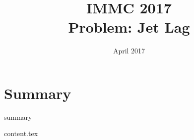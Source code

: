 \documentclass{article}
\title{IMMC 2017 \\
	\large Problem: Jet Lag}
\date{April 2017}
\begin{document}
\setlength{\abovedisplayskip}{0pt}
\setlength{\abovedisplayskip}{0pt}
\setlength{\belowdisplayskip}{0pt}

\vfill
\maketitle
\vfill
\section{Summary}
{summary}
\vfill

\clearpage

\tableofcontents
	\clearpage

{content.tex}
\end{document}
